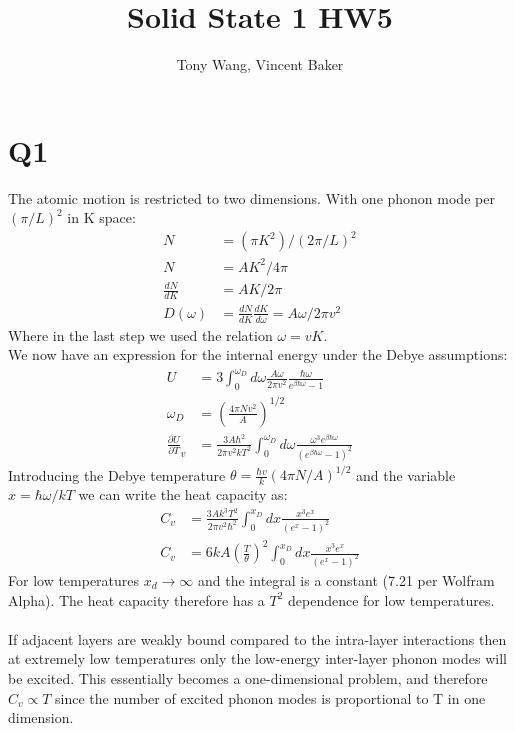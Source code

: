 \documentclass[a4paper,11pt]{article}
\title{Solid State 1 HW5}
\author{Tony Wang, Vincent Baker}
\numberwithin{equation}{section}
\newcommand{\lrp}[1]{\left({#1}\right)}
\begin{document}
\maketitle

\section*{Q1}
The atomic motion is restricted to two dimensions. 
With one phonon mode per $(\pi/L)^2$ in K space:
\begin{align}
 N &= (\pi K^2)/(2\pi/L)^2\\
 N &= AK^2/4\pi\\
 \frac{dN}{dK} &= AK/2\pi\\ 
 D(\omega) &=  \frac{dN}{dK}\frac{dK}{d\omega} = A\omega/2\pi v^2
\end{align}
Where in the last step we used the relation $\omega=vK$.\\
We now have an expression for the internal energy under the Debye assumptions:
\begin{align}
 U &= 3\int_0^{\omega_D} d\omega \frac{A\omega}{2\pi v^2}\frac{\hbar \omega}{e^{\beta \hbar \omega}-1}\\
 \omega_D &= \lrp{\frac{4\pi Nv^2}{A}}^{1/2}\\
 \frac{\partial U}{\partial T}_v &= \frac{3A\hbar^2}{2\pi v^2kT^2} \int_0^{\omega_D} d\omega \frac{\omega^3e^{\beta\hbar\omega}}{\lrp{e^{\beta \hbar \omega}-1}^2}
\end{align}
Introducing the Debye temperature $\theta = \frac{\hbar v}{k}\lrp{4\pi N/A}^{1/2}$ and the variable $x=\hbar \omega /kT$ we can write the heat capacity as:
\begin{align}
 C_v &=  \frac{3Ak^3T^2}{2\pi v^2\hbar^2}\int_0^{x_D} dx \frac{x^3e^x}{\lrp{e^x-1}^2}\\
 C_v &=  6kA\lrp{\frac{T}{\theta}}^2\int_0^{x_D} dx \frac{x^3e^x}{\lrp{e^x-1}^2}
\end{align}
For low temperatures $x_d \rightarrow \infty$ and the integral is a constant (7.21 per Wolfram Alpha). 
The heat capacity therefore has a $T^2$ dependence for low temperatures.\\ \\
If adjacent layers are weakly bound compared to the intra-layer interactions then at extremely low temperatures only the low-energy inter-layer phonon modes will be excited.
This essentially becomes a one-dimensional problem, and therefore $C_v \propto T$ since the number of excited phonon modes is proportional to T in one dimension.
\\ 
\end{document}

